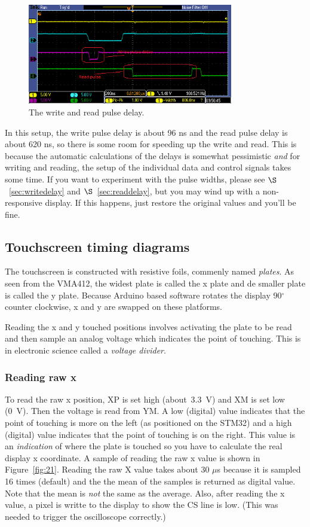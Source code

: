 \documentclass[12pt]{article}
\begin{document}
\begin{figure}[!ht]
\centering
\includegraphics[width=0.8\textwidth]{write_read_delay}
\caption{The write and read pulse delay.}
\label{fig:12}
\end{figure}

In this setup, the write pulse delay is about 96 ns and the read pulse delay is about 620 ns, so there is some room for speeding up the write and read. This is because the automatic calculations of the delays is somewhat pessimistic \textsl{and} for writing and reading, the setup of the individual data and control signals takes some time. If you want to experiment with the pulse widths, please see $\S$~\ref{sec:writedelay} and $\S$~\ref{sec:readdelay}, but you may wind up with a non-responsive display. If this happens, just restore the original values and you'll be fine.


\subsection{Touchscreen timing diagrams}
\label{sec:tstidi}
The touchscreen is constructed with resistive foils, commenly named \textsl{plates}. As seen from the VMA412, the widest plate is called the x plate and de smaller plate is called the y plate. Because Arduino based software rotates the display 90$^\circ$ counter clockwise, x and y are swapped on these platforms.

Reading the x and y touched positions involves activating the plate to be read and then sample an analog voltage which indicates the point of touching. This is in electronic science called a \textsl{voltage divider}.

\subsubsection{Reading raw x}
To read the raw x position, XP is set high (about~3.3~V) and XM is set low (0~V). Then the voltage is read from YM. A low (digital) value indicates that the point of touching is more on the left (as positioned on the STM32) and a high (digital) value indicates that the point of touching is on the right. This value is an \textsl{indication} of where the plate is touched so you have to calculate the real display x coordinate. A sample of reading the raw x value is shown in Figure~\ref{fig:21}. Reading the raw X value takes about 30 $\mu$s because it is sampled 16 times (default) and the the mean of the samples is returned as digital value. Note that the mean is \textsl{not} the same as the average. Also, after reading the x value, a pixel is writte to the display to show the CS line is low. (This was needed to trigger the oscilloscope correctly.)
\end{document}
